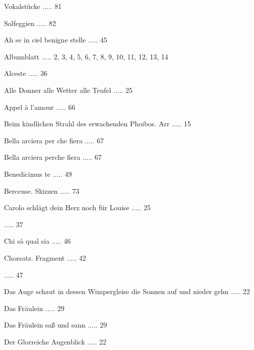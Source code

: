 \documentclass[a4paper, twocolumn, 11pt]{book}
\begin{document}
 Vokalstücke ..... 81

 Solfeggien ..... 82

\newline 
Ah se in ciel benigne stelle ..... 45

\newline 
Albumblatt ..... 2, 3, 4, 5, 6, 7, 8, 9, 10, 11, 12, 13, 14

\newline 
Alceste ..... 36

\newline 
Alle Donner alle Wetter alle Teufel ..... 25

\newline 
Appel à l'amour ..... 66

\newline 
Beim kindlichen Strahl des erwachenden Phoibos. Arr ..... 15

\newline 
Bella arciera per che fiera ..... 67

\newline 
Bella arciera perche fiera ..... 67

\newline 
Benedicimus te ..... 49

\newline 
Berceuse. Skizzen ..... 73

\newline 
Carolo schlägt dein Herz noch für Louise ..... 25

 ..... 37

\newline 
Chi sà qual sia ..... 46

\newline 
Chorsatz. Fragment ..... 42

 ..... 47

\newline 
Das Auge schaut in dessen Wimpergleise die Sonnen auf und nieder gehn ..... 22

\newline 
Das Fräulein ..... 29

\newline 
Das Fräulein saß und sann ..... 29

\newline 
Der Glorreiche Augenblick ..... 22
\end{document}
